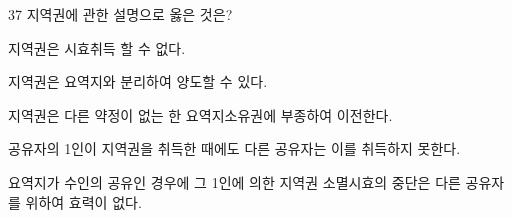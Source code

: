 \begin{question}{37}
지역권에 관한 설명으로 옳은 것은?
\begin{choices}
  \item 지역권은 시효취득 할 수 없다.
  \item 지역권은 요역지와 분리하여 양도할 수 있다.
  \item 지역권은 다른 약정이 없는 한 요역지소유권에 부종하여 이전한다.
  \item 공유자의 1인이 지역권을 취득한 때에도 다른 공유자는 이를 취득하지 못한다.
  \item 요역지가 수인의 공유인 경우에 그 1인에 의한 지역권 소멸시효의 중단은 다른 공유자를 위하여 효력이 없다.
\end{choices}
\end{question}
